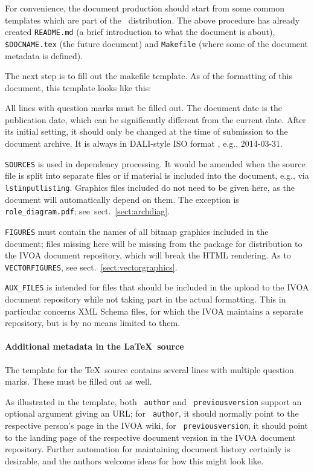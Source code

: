 \documentclass[11pt,a4paper]{ivoa}
\newcommand{\texword}[1]{\texttt{\color{texcolor} #1}}
\begin{document}
For convenience, the document production should start from some common
templates which are part of the \ivoatex\ distribution.  The above
procedure has already created \verb|README.md| (a brief introduction to
what the document is about), \verb|$DOCNAME.tex| (the future document)
and \verb|Makefile| (where some of the document metadata is defined).


The next step is to fill out the makefile template.  
As of the formatting of this document, this template looks like this:



All lines with question marks must be filled out.  The document date
is the publication date, which can be significantly different from the
current date.  After its initial setting, it should only be changed at
the time of submission to the document archive.  It is always in
DALI-style ISO format \citep{2017ivoa.spec.0517D}, e.g., 2014-03-31.

\texttt{SOURCES} is used in dependency processing.  It would be amended
when the source file is split into separate files or if material is
included into the document, e.g., via \texword{lstinputlisting}.
Graphics files included do not need to be given here, as the document
will automatically depend on them.  The exception is
\verb|role_diagram.pdf|; see~sect.~\ref{sect:archdiag}.

\texttt{FIGURES} must contain the names of all bitmap graphics included
in the document; files missing here will be missing from the package for
distribution to the IVOA document repository, which will break the HTML
rendering.  As to \texttt{VECTORFIGURES}, see
sect.~\ref{sect:vectorgraphics}.

\texttt{AUX\_FILES} is intended for files that should be included in the
upload to the IVOA document repository while not taking part in the
actual formatting.  This in particular concerns XML Schema files, for
which the IVOA maintains a separate repository, but is by no means
limited to them.

\paragraph{Additional metadata in the \LaTeX~source}

The template for the \TeX\ source contains several lines with
multiple question marks.  These must be filled out as well.

As illustrated in the template, both \texword{author} and
\texword{previousversion} support an optional argument giving an URL; for
\texword{author}, it should normally point to the respective person's
page in the IVOA wiki, for \texword{previousversion}, it should point to
the landing page of the respective document version in the IVOA document
repository.  Further automation for maintaining document history
certainly is desirable, and the authors welcome ideas for how this might
look like.
\end{document}
